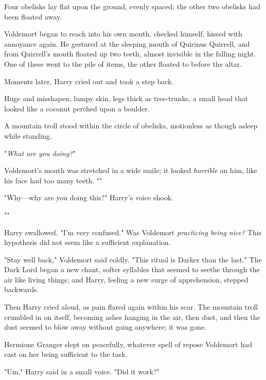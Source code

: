Four obelisks lay flat upon the ground, evenly spaced; the other two obelisks
had been floated away.

Voldemort began to reach into his own mouth, checked himself, hissed with
annoyance again. He gestured at the sleeping mouth of Quirinus Quirrell, and
from Quirrell's mouth floated up two teeth, almost invisible in the falling
night. One of these went to the pile of items, the other floated to before the
altar.

Moments later, Harry cried out and took a step back.

Huge and misshapen, lumpy skin, legs thick as tree-trunks, a small head that
looked like a coconut perched upon a boulder.

A mountain troll stood within the circle of obelisks, motionless as though
asleep while standing.

"\emph{What are you doing?}"

Voldemort's mouth was stretched in a wide smile; it looked \emph{horrible} on
him, like his face had too many teeth. ""

"Why---why are you doing this?" Harry's voice shook.

""

Harry swallowed. "I'm very confused." Was Voldemort \emph{practicing being
nice?} This hypothesis did not seem like a sufficient explanation.

"Stay well back," Voldemort said coldly. "This ritual is Darker than the last."
The Dark Lord began a new chant, softer syllables that seemed to seethe through
the air like living things; and Harry, feeling a new surge of apprehension,
stepped backwards.

Then Harry cried aloud, as pain flared again within his scar. The mountain
troll crumbled in on itself, becoming ashes hanging in the air, then dust, and
then the dust seemed to blow away without going anywhere; it was gone.

Hermione Granger slept on peacefully, whatever spell of repose Voldemort had
cast on her being sufficient to the task.

"Um," Harry said in a small voice. "Did it work?"

